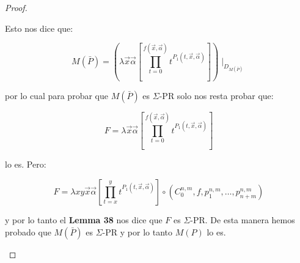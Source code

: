 \begin{proof}
\begin{enumerate}[a)]
        \par Esto nos dice que:

        \[
          M(\bar{P}) = \left(\lambda \vec{x}\vec{\alpha}\left[\prod_{t=0}^{f(\vec{x},\vec{\alpha})}t^{P_{1}(t,\vec{x},
          \vec{\alpha})}\right]\right) \mid_{D_{M(\bar{P})}}
        \]

        \par por lo cual para probar que $M(\bar{P})$ es $\Sigma$-PR solo nos resta probar que:

        \[
          F = \lambda \vec{x}\vec{\alpha}\left[\prod_{t=0}^{f(\vec{x},\vec{\alpha})}t^{P_{1}(t,\vec{x},\vec{\alpha})}
          \right]
        \]

        \par lo es. Pero:

        \[
          F = \lambda xy\vec{x}\vec{\alpha}\left[\prod_{t=x}^{y}t^{P_{1}(t,\vec{x},\vec{\alpha})}\right] \circ
          (C_{0}^{n,m}, f, p_{1}^{n,m}, \dotsc, p_{n+m}^{n,m})
        \]

        \par y por lo tanto el \textbf{Lemma 38} nos dice que $F$ es $\Sigma$-PR. De esta manera hemos probado que
        $M(\bar{P})$ es $\Sigma$-PR y por lo tanto $M(P)$ lo es.
    \end{enumerate}
  \end{proof}


